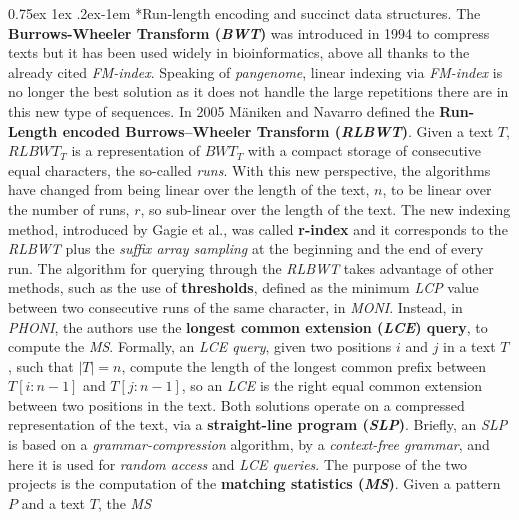 \documentclass[a4paper,11pt, oneside]{article}
\makeatletter
\newcommand{\pb}[1]{\todo[backgroundcolor=red]{\textbf{PB} #1}}
\renewcommand{\paragraph}{%
  \@startsection{paragraph}{4}%
  {\z@}{0.75ex \@plus 1ex \@minus .2ex}{-1em}%
  {\normalfont\normalsize\bfseries}%
}
\makeatother
\begin{document}
\paragraph*{Run-length encoding and succinct data structures.}
The \textbf{Burrows-Wheeler Transform (\textit{BWT})} was introduced
in 1994 to compress texts but it has been used widely
in bioinformatics, above all thanks to the already cited
\textit{FM-index}.
Speaking of \textit{pangenome}, linear indexing via \textit{FM-index} is no
longer the 
best solution as it does not handle the large repetitions there are in this new
type of sequences. In 2005 M\"{a}niken and Navarro defined 
the \textbf{Run-Length encoded Burrows–Wheeler Transform
  (\textit{RLBWT})}. Given a text 
$T$, $RLBWT_T$ is a representation of $BWT_T$ with a compact storage of
consecutive equal characters, the so-called \textit{runs}. With this new
perspective, the algorithms have changed from being linear over the length of
the text, $n$, to be linear over the number of runs, $r$, so sub-linear over
the length of the text. The new indexing method, introduced by Gagie et al., was
called \textbf{r-index} 
and it corresponds to the \textit{RLBWT} plus the \textit{suffix array sampling}
at the beginning and the end of every run. The algorithm for querying through
the \textit{RLBWT} takes advantage of other methods, such as the use of
\textbf{thresholds}, defined as the minimum \textit{LCP} value between two
consecutive runs of the same character, in \textit{MONI}. Instead, in
\textit{PHONI}, the authors use the \textbf{longest common extension
  (\textit{LCE}) query}, to compute the \textit{MS}. Formally, an \textit{LCE
  query}, given two positions $i$ and $j$ in a text $T$, such that $|T|=n$,
compute the length of the longest common prefix between $T[i:n-1]$ and
$T[j:n-1]$, so an \textit{LCE} is the right equal common extension 
between two positions in the text. Both solutions operate on a compressed
representation of the text, via a
\textbf{straight-line program (\textit{SLP})}. Briefly, an \textit{SLP} is based
on a \textit{grammar-compression} algorithm, by a \textit{context-free grammar},
and here it is used for \textit{random access} and \textit{LCE queries}. 
The purpose of the two projects is the computation of the \textbf{matching
  statistics (\textit{MS})}. Given a pattern $P$ and a text $T$, the \textit{MS}
\end{document}
